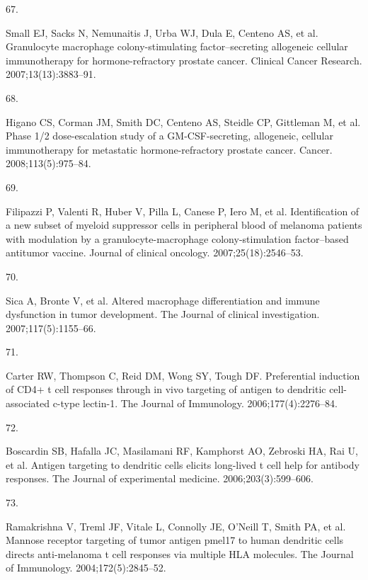 \documentclass[
]{article}
\newlength{\cslhangindent}
\newlength{\csllabelwidth}
\newenvironment{CSLReferences}[2] %
 {\begin{list}{}{%
  \setlength{\itemindent}{0pt}
  \setlength{\leftmargin}{0pt}
  \setlength{\parsep}{0pt}
  \ifodd #1
   \setlength{\leftmargin}{\cslhangindent}
   \setlength{\itemindent}{-1\cslhangindent}
  \fi
  \setlength{\itemsep}{#2\baselineskip}}}
 {\end{list}}
\newcommand{\CSLLeftMargin}[1]{\parbox[t]{\csllabelwidth}{\strut#1\strut}}
\newcommand{\CSLRightInline}[1]{\parbox[t]{\linewidth - \csllabelwidth}{\strut#1\strut}}
\begin{document}
\begin{CSLReferences}{0}{1}
\CSLLeftMargin{67. }%
\CSLRightInline{Small EJ, Sacks N, Nemunaitis J, Urba WJ, Dula E,
Centeno AS, et al. Granulocyte macrophage colony-stimulating
factor--secreting allogeneic cellular immunotherapy for
hormone-refractory prostate cancer. Clinical Cancer Research.
2007;13(13):3883--91. }

\CSLLeftMargin{68. }%
\CSLRightInline{Higano CS, Corman JM, Smith DC, Centeno AS, Steidle CP,
Gittleman M, et al. Phase 1/2 dose-escalation study of a
GM-CSF-secreting, allogeneic, cellular immunotherapy for metastatic
hormone-refractory prostate cancer. Cancer. 2008;113(5):975--84. }

\CSLLeftMargin{69. }%
\CSLRightInline{Filipazzi P, Valenti R, Huber V, Pilla L, Canese P, Iero
M, et al. Identification of a new subset of myeloid suppressor cells in
peripheral blood of melanoma patients with modulation by a
granulocyte-macrophage colony-stimulation factor--based antitumor
vaccine. Journal of clinical oncology. 2007;25(18):2546--53. }

\CSLLeftMargin{70. }%
\CSLRightInline{Sica A, Bronte V, et al. Altered macrophage
differentiation and immune dysfunction in tumor development. The Journal
of clinical investigation. 2007;117(5):1155--66. }

\CSLLeftMargin{71. }%
\CSLRightInline{Carter RW, Thompson C, Reid DM, Wong SY, Tough DF.
Preferential induction of CD4+ t cell responses through in vivo
targeting of antigen to dendritic cell-associated c-type lectin-1. The
Journal of Immunology. 2006;177(4):2276--84. }

\CSLLeftMargin{72. }%
\CSLRightInline{Boscardin SB, Hafalla JC, Masilamani RF, Kamphorst AO,
Zebroski HA, Rai U, et al. Antigen targeting to dendritic cells elicits
long-lived t cell help for antibody responses. The Journal of
experimental medicine. 2006;203(3):599--606. }

\CSLLeftMargin{73. }%
\CSLRightInline{Ramakrishna V, Treml JF, Vitale L, Connolly JE, O'Neill
T, Smith PA, et al. Mannose receptor targeting of tumor antigen pmel17
to human dendritic cells directs anti-melanoma t cell responses via
multiple HLA molecules. The Journal of Immunology. 2004;172(5):2845--52.
}


\end{CSLReferences}
\end{document}
